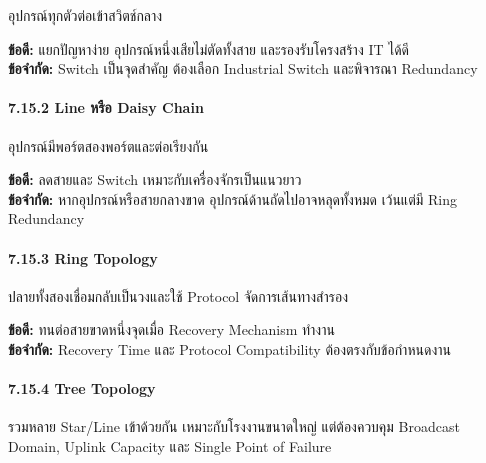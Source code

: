อุปกรณ์ทุกตัวต่อเข้าสวิตช์กลาง

\textbf{ข้อดี:} แยกปัญหาง่าย อุปกรณ์หนึ่งเสียไม่ตัดทั้งสาย และรองรับโครงสร้าง IT ได้ดี \\
\textbf{ข้อจำกัด:} Switch เป็นจุดสำคัญ ต้องเลือก Industrial Switch และพิจารณา Redundancy

\paragraph{7.15.2 Line หรือ Daisy Chain}

อุปกรณ์มีพอร์ตสองพอร์ตและต่อเรียงกัน

\textbf{ข้อดี:} ลดสายและ Switch เหมาะกับเครื่องจักรเป็นแนวยาว \\
\textbf{ข้อจำกัด:} หากอุปกรณ์หรือสายกลางขาด อุปกรณ์ด้านถัดไปอาจหลุดทั้งหมด เว้นแต่มี Ring Redundancy

\paragraph{7.15.3 Ring Topology}

ปลายทั้งสองเชื่อมกลับเป็นวงและใช้ Protocol จัดการเส้นทางสำรอง

\textbf{ข้อดี:} ทนต่อสายขาดหนึ่งจุดเมื่อ Recovery Mechanism ทำงาน \\
\textbf{ข้อจำกัด:} Recovery Time และ Protocol Compatibility ต้องตรงกับข้อกำหนดงาน

\paragraph{7.15.4 Tree Topology}

รวมหลาย Star/Line เข้าด้วยกัน เหมาะกับโรงงานขนาดใหญ่ แต่ต้องควบคุม Broadcast Domain, Uplink Capacity และ Single Point of Failure



